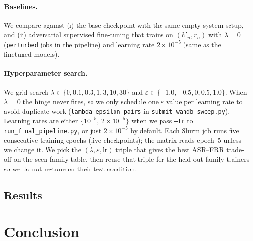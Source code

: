 \documentclass{article}
\begin{document}
\paragraph{Baselines.}
We compare against (i) the base checkpoint with the same empty-system setup, and (ii) adversarial supervised fine-tuning that trains on $(h'_n,r_n)$ with $\lambda{=}0$ (\texttt{perturbed} jobs in the pipeline) and learning rate $2{\times}10^{-5}$ (same as the finetuned models).

\paragraph{Hyperparameter search.}
We grid-search
$\lambda\in\{0,0.1,0.3,1,3,10,30\}$ and
$\varepsilon\in\{-1.0,-0.5,0,0.5,1.0\}$.
When $\lambda{=}0$ the hinge never fires, so we only schedule one $\varepsilon$ value per learning rate to avoid duplicate work (\texttt{lambda\_epsilon\_pairs} in \texttt{submit\_wandb\_sweep.py}). Learning rates are either $\{10^{-5},\,2{\times}10^{-5}\}$ when we pass \texttt{--lr} to \texttt{run\_final\_pipeline.py}, or just $2{\times}10^{-5}$ by default. Each Slurm job runs five consecutive training epochs (five checkpoints); the matrix reads epoch~5 unless we change it. We pick the $(\lambda,\varepsilon,\text{lr})$ triple that gives the best ASR--FRR trade-off on the seen-family table, then reuse that triple for the held-out-family trainers so we do not re-tune on their test condition.

\subsection{Results}

\section{Conclusion}

\begin{ack}
\end{ack}




\appendix
\end{document}
